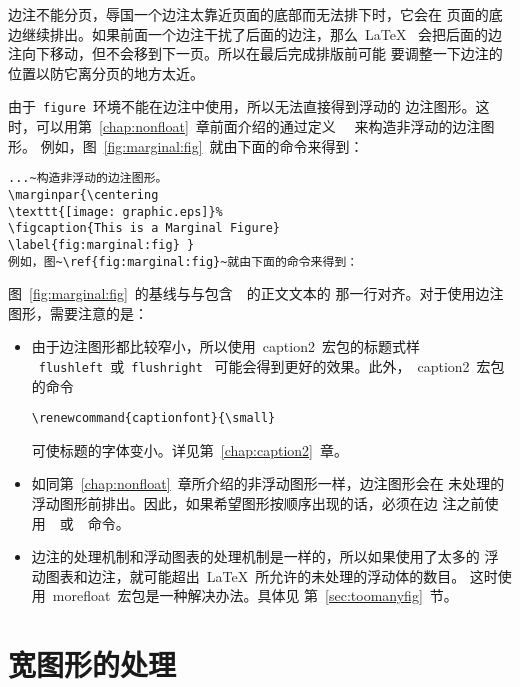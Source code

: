 边注不能分页，辱国一个边注太靠近页面的底部而无法排下时，它会在
页面的底边继续排出。如果前面一个边注干扰了后面的边注，那么~\LaTeX{}~
会把后面的边注向下移动，但不会移到下一页。所以在最后完成排版前可能
要调整一下边注的位置以防它离分页的地方太近。

由于~\texttt{figure}~环境不能在边注中使用，所以无法直接得到浮动的
边注图形。这时，可以用第~\ref{chap:nonfloat}~章前面介绍的通过定义
~~来构造非浮动的边注图形。
例如，图~\ref{fig:marginal:fig}~就由下面的命令来得到：
\begin{Verbatim}[xleftmargin=1cm]
...~构造非浮动的边注图形。
\marginpar{\centering 
\texttt{[image: graphic.eps]}% 
\figcaption{This is a Marginal Figure} 
\label{fig:marginal:fig} }
例如，图~\ref{fig:marginal:fig}~就由下面的命令来得到：
\end{Verbatim}

图~\ref{fig:marginal:fig}~的基线与与包含~~的正文文本的
那一行对齐。对于使用边注图形，需要注意的是：
\begin{itemize}
	\item 由于边注图形都比较窄小，所以使用~\textsf{caption2}~宏包的标题式样
	~\texttt{flushleft}~或~\texttt{flushright}~
	可能会得到更好的效果。此外，~\textsf{caption2}~宏包的命令
	\begin{Verbatim}[xleftmargin=1cm]
	\renewcommand{captionfont}{\small}
	\end{Verbatim}
	可使标题的字体变小。详见第~\ref{chap:caption2}~章。
	\item 如同第~\ref{chap:nonfloat}~章所介绍的非浮动图形一样，边注图形会在
	未处理的浮动图形前排出。因此，如果希望图形按顺序出现的话，必须在边
	注之前使用~~或~~命令。
	\item 边注的处理机制和浮动图表的处理机制是一样的，所以如果使用了太多的
	浮动图表和边注，就可能超出~\LaTeX{}~所允许的未处理的浮动体的数目。
	这时使用~\textsf{morefloat}~宏包是一种解决办法。具体见
	第~\ref{sec:toomanyfig}~节。
\end{itemize}      

\section{宽图形的处理}

